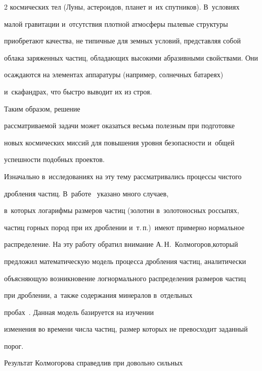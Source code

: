 \begin{multicols}{2}
космических тел (Луны, астероидов, планет и~их спутников). В~условиях 


малой гравитации и~отсутствия плотной атмосферы пылевые структуры 


приобретают качества, не типичные для земных условий, представляя собой 


облака заряженных частиц, обладающих высокими абразивными свойствами. Они 


осаждаются на элементах аппаратуры (например, солнечных батареях) 


и~скафандрах, что быстро выводит их из строя. 





Таким образом, решение 


рассматриваемой задачи может оказаться весьма полезным при подготовке 


новых космических миссий для повышения уровня безопасности и~общей 


успешности подобных проектов.





Изначально в~исследованиях на эту тему рассматривались процессы чистого 


дробления частиц. В~работе~\cite{Razumovskii1940} указано много случаев, 


в~которых логарифмы размеров частиц (золотин в~золотоносных россыпях, 


частиц горных пород при их дроблении и~т.\,п.)\ имеют примерно нормальное 


распределение. На эту работу обратил внимание А.\,Н.~Колмогоров,\linebreak который 


предложил математическую модель процесса дробления частиц, аналитически 


объяс\-ня\-ющую возникновение логнормального распределения размеров частиц 


при дроблении, а~также \mbox{содержания} минералов в~отдельных 


пробах~\cite{Kolmogorov1941}. Данная модель базируется на изучении 


изменения во времени числа частиц, размер которых не превосходит заданный 


порог.





 Результат Колмогорова справедлив при довольно сильных 



\end{multicols}
